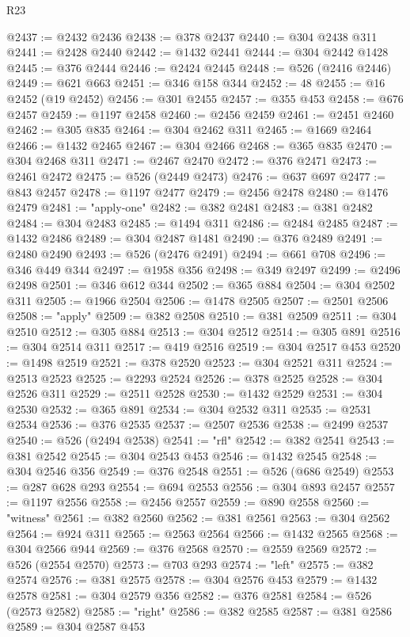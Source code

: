 \begin{lexlean}{R23}
\begin{coremodule}
@2437 := @2432 @2436
@2438 := @378 @2437
@2440 := @304 @2438 @311
@2441 := @2428 @2440
@2442 := @1432 @2441
@2444 := @304 @2442 @1428
@2445 := @376 @2444
@2446 := @2424 @2445
@2448 := @526 (@2416 @2446)
@2449 := @621 @663
@2451 := @346 @158 @344
@2452 := 48
@2455 := @16 @2452 (@19 @2452)
@2456 := @301 @2455
@2457 := @355 @453
@2458 := @676 @2457
@2459 := @1197 @2458
@2460 := @2456 @2459
@2461 := @2451 @2460
@2462 := @305 @835
@2464 := @304 @2462 @311
@2465 := @1669 @2464
@2466 := @1432 @2465
@2467 := @304 @2466
@2468 := @365 @835
@2470 := @304 @2468 @311
@2471 := @2467 @2470
@2472 := @376 @2471
@2473 := @2461 @2472
@2475 := @526 (@2449 @2473)
@2476 := @637 @697
@2477 := @843 @2457
@2478 := @1197 @2477
@2479 := @2456 @2478
@2480 := @1476 @2479
@2481 := "apply-one"
@2482 := @382 @2481
@2483 := @381 @2482
@2484 := @304 @2483
@2485 := @1494 @311
@2486 := @2484 @2485
@2487 := @1432 @2486
@2489 := @304 @2487 @1481
@2490 := @376 @2489
@2491 := @2480 @2490
@2493 := @526 (@2476 @2491)
@2494 := @661 @708
@2496 := @346 @449 @344
@2497 := @1958 @356
@2498 := @349 @2497
@2499 := @2496 @2498
@2501 := @346 @612 @344
@2502 := @365 @884
@2504 := @304 @2502 @311
@2505 := @1966 @2504
@2506 := @1478 @2505
@2507 := @2501 @2506
@2508 := "apply"
@2509 := @382 @2508
@2510 := @381 @2509
@2511 := @304 @2510
@2512 := @305 @884
@2513 := @304 @2512
@2514 := @305 @891
@2516 := @304 @2514 @311
@2517 := @419 @2516
@2519 := @304 @2517 @453
@2520 := @1498 @2519
@2521 := @378 @2520
@2523 := @304 @2521 @311
@2524 := @2513 @2523
@2525 := @2293 @2524
@2526 := @378 @2525
@2528 := @304 @2526 @311
@2529 := @2511 @2528
@2530 := @1432 @2529
@2531 := @304 @2530
@2532 := @365 @891
@2534 := @304 @2532 @311
@2535 := @2531 @2534
@2536 := @376 @2535
@2537 := @2507 @2536
@2538 := @2499 @2537
@2540 := @526 (@2494 @2538)
@2541 := "rfl"
@2542 := @382 @2541
@2543 := @381 @2542
@2545 := @304 @2543 @453
@2546 := @1432 @2545
@2548 := @304 @2546 @356
@2549 := @376 @2548
@2551 := @526 (@686 @2549)
@2553 := @287 @628 @293
@2554 := @694 @2553
@2556 := @304 @893 @2457
@2557 := @1197 @2556
@2558 := @2456 @2557
@2559 := @890 @2558
@2560 := "witness"
@2561 := @382 @2560
@2562 := @381 @2561
@2563 := @304 @2562
@2564 := @924 @311
@2565 := @2563 @2564
@2566 := @1432 @2565
@2568 := @304 @2566 @944
@2569 := @376 @2568
@2570 := @2559 @2569
@2572 := @526 (@2554 @2570)
@2573 := @703 @293
@2574 := "left"
@2575 := @382 @2574
@2576 := @381 @2575
@2578 := @304 @2576 @453
@2579 := @1432 @2578
@2581 := @304 @2579 @356
@2582 := @376 @2581
@2584 := @526 (@2573 @2582)
@2585 := "right"
@2586 := @382 @2585
@2587 := @381 @2586
@2589 := @304 @2587 @453

\end{coremodule}
\end{lexlean}
